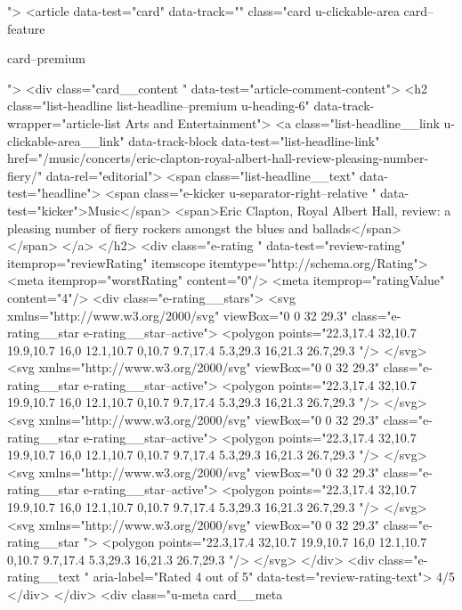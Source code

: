 {{{			
			
			
			">
<article data-test="card" data-track="" class="card
			u-clickable-area
			card--feature
			
			card--premium
			
			
			
			
			
			 ">
<div class="card__content " data-test="article-comment-content">
<h2 class="list-headline list-headline--premium u-heading-6" data-track-wrapper="article-list Arts and Entertainment">
<a class="list-headline__link u-clickable-area__link" data-track-block data-test="list-headline-link" href="/music/concerts/eric-clapton-royal-albert-hall-review-pleasing-number-fiery/" data-rel="editorial">
<span class="list-headline__text" data-test="headline">
<span class="e-kicker u-separator-right--relative " data-test="kicker">Music</span>
<span>Eric Clapton, Royal Albert Hall, review: a pleasing number of fiery rockers amongst the blues and ballads</span>
</span>
</a>
</h2>
<div class="e-rating " data-test="review-rating" itemprop="reviewRating" itemscope itemtype="http://schema.org/Rating">
<meta itemprop="worstRating" content="0"/>
<meta itemprop="ratingValue" content="4"/>
<div class="e-rating__stars">
<svg xmlns="http://www.w3.org/2000/svg" viewBox="0 0 32 29.3" class="e-rating__star  e-rating__star--active">
<polygon points="22.3,17.4 32,10.7 19.9,10.7 16,0 12.1,10.7 0,10.7 9.7,17.4 5.3,29.3 16,21.3 26.7,29.3 "/>
</svg>
<svg xmlns="http://www.w3.org/2000/svg" viewBox="0 0 32 29.3" class="e-rating__star  e-rating__star--active">
<polygon points="22.3,17.4 32,10.7 19.9,10.7 16,0 12.1,10.7 0,10.7 9.7,17.4 5.3,29.3 16,21.3 26.7,29.3 "/>
</svg>
<svg xmlns="http://www.w3.org/2000/svg" viewBox="0 0 32 29.3" class="e-rating__star  e-rating__star--active">
<polygon points="22.3,17.4 32,10.7 19.9,10.7 16,0 12.1,10.7 0,10.7 9.7,17.4 5.3,29.3 16,21.3 26.7,29.3 "/>
</svg>
<svg xmlns="http://www.w3.org/2000/svg" viewBox="0 0 32 29.3" class="e-rating__star  e-rating__star--active">
<polygon points="22.3,17.4 32,10.7 19.9,10.7 16,0 12.1,10.7 0,10.7 9.7,17.4 5.3,29.3 16,21.3 26.7,29.3 "/>
</svg>
<svg xmlns="http://www.w3.org/2000/svg" viewBox="0 0 32 29.3" class="e-rating__star  ">
<polygon points="22.3,17.4 32,10.7 19.9,10.7 16,0 12.1,10.7 0,10.7 9.7,17.4 5.3,29.3 16,21.3 26.7,29.3 "/>
</svg>
</div>
<div class="e-rating__text " aria-label="Rated 4 out of 5" data-test="review-rating-text">
4/5
</div>
</div>
<div class="u-meta card__meta
						
}}}
